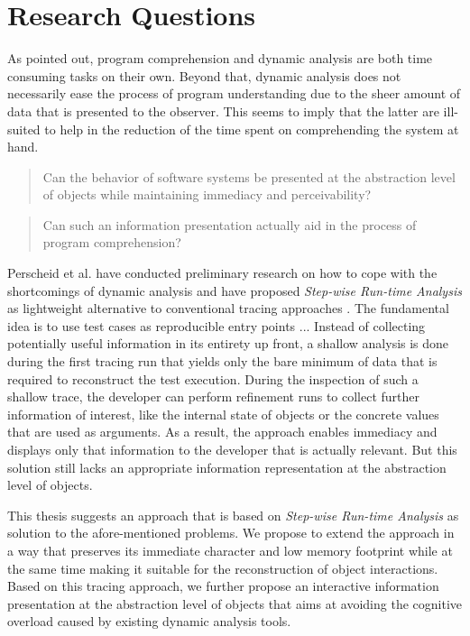 \section{Research Questions}
As pointed out, program comprehension and dynamic analysis are both time consuming tasks on their own.
Beyond that, dynamic analysis does not necessarily ease the process of program understanding due to the sheer amount of data that is presented to the observer.
This seems to imply that the latter are ill-suited to help in the reduction of the time spent on comprehending the system at hand.


\begin{quote}
Can the behavior of software systems be presented at the abstraction level of objects while maintaining immediacy and perceivability?
\end{quote}
\begin{quote}
Can such an information presentation actually aid in the process of program comprehension?
\end{quote}

Perscheid et al. have conducted preliminary research on how to cope with the shortcomings of dynamic analysis and have proposed \emph{Step-wise Run-time Analysis} as lightweight alternative to conventional tracing approaches \cite{perscheid_immediacy_2010}.
The fundamental idea is to use test cases as reproducible entry points ...
Instead of collecting potentially useful information in its entirety up front, a shallow analysis is done during the first tracing run that yields only the bare minimum of data that is required to reconstruct the test execution.
During the inspection of such a shallow trace, the developer can perform refinement runs to collect further information of interest, like the internal state of objects or the concrete values that are used as arguments.
As a result, the approach enables immediacy and displays only that information to the developer that is actually relevant.
But this solution still lacks an appropriate information representation at the abstraction level of objects.

This thesis suggests an approach that is based on \emph{Step-wise Run-time Analysis} as solution to the afore-mentioned problems. 
We propose to extend the approach in a way that preserves its immediate character and low memory footprint while at the same time making it suitable for the reconstruction of object interactions.
Based on this tracing approach, we further propose an interactive information presentation at the abstraction level of objects that aims at avoiding the cognitive overload caused by existing dynamic analysis tools.

